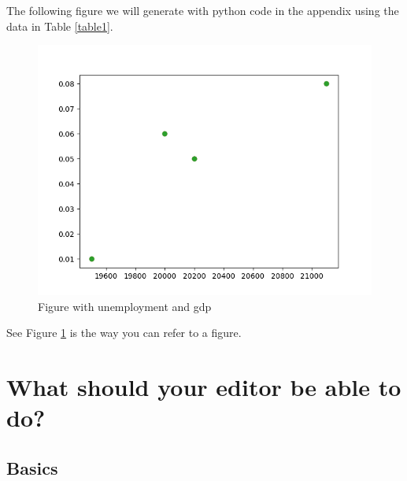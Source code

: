 \documentclass[11pt]{article}
\begin{document}
The following figure we will generate with python code in the appendix using the data in Table \ref{table1}.

\begin{figure}[htbp]
\centering
\includegraphics[width=.9\linewidth]{./fig.png}
\caption{\label{figure1} Figure with unemployment and gdp}
\end{figure}

See Figure \ref{figure1} is the way you can refer to a figure.

\section{What should your editor be able to do?}


\subsection{Basics}
\end{document}
